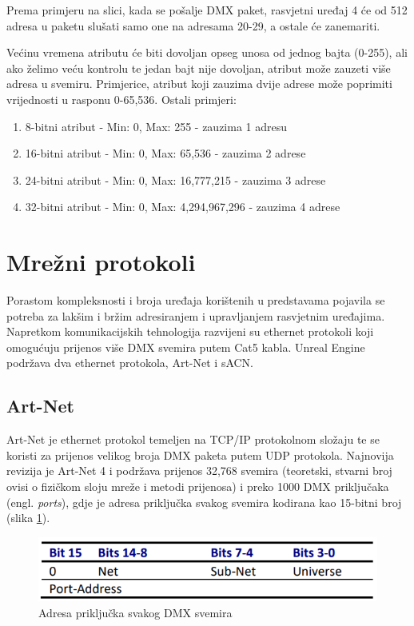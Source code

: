 \documentclass[times, utf8, zavrsni, numeric]{fer}
\begin{document}
Prema primjeru na slici, kada se pošalje DMX paket, rasvjetni uređaj 4 će od 512 adresa u paketu slušati samo one na adresama 20-29, a ostale će zanemariti. \newline

Većinu vremena atributu će biti dovoljan opseg unosa od jednog bajta (0-255), ali ako želimo veću kontrolu te jedan bajt nije dovoljan, atribut može zauzeti više adresa u svemiru. Primjerice, atribut koji zauzima dvije adrese može poprimiti vrijednosti u rasponu 0-65,536. Ostali primjeri:

\begin{enumerate}
	\item 8-bitni atribut - Min: 0, Max: 255 - zauzima 1 adresu
	\item 16-bitni atribut - Min: 0, Max: 65,536 - zauzima 2 adrese
	\item 24-bitni atribut - Min: 0, Max: 16,777,215  - zauzima 3 adrese
	\item 32-bitni atribut - Min: 0, Max: 4,294,967,296  - zauzima 4 adrese
\end{enumerate}

\section{Mrežni protokoli}
Porastom kompleksnosti i broja uređaja korištenih u predstavama pojavila se potreba za lakšim i bržim adresiranjem i upravljanjem rasvjetnim uređajima. Napretkom komunikacijskih tehnologija razvijeni su ethernet protokoli koji omogućuju prijenos više DMX svemira putem Cat5 kabla. Unreal Engine podržava dva ethernet protokola, Art-Net i sACN.

\subsection{Art-Net}
Art-Net je ethernet protokol temeljen na TCP/IP protokolnom složaju te se koristi za prijenos velikog broja DMX paketa putem UDP protokola. Najnovija revizija je Art-Net 4 i podržava prijenos 32,768 svemira (teoretski, stvarni broj ovisi o fizičkom sloju mreže i metodi prijenosa) i preko 1000 DMX priključaka (engl. \emph{ports}), gdje je adresa priključka svakog svemira kodirana kao 15-bitni broj (slika \ref{fig:slika 3-3}).

\begin{figure}[htp]
	\centering
	\includegraphics[width=\linewidth]{slika 3-3.png}
	\caption{Adresa priključka svakog DMX svemira \cite{art-net}}
	\label{fig:slika 3-3}
\end{figure}
\end{document}
